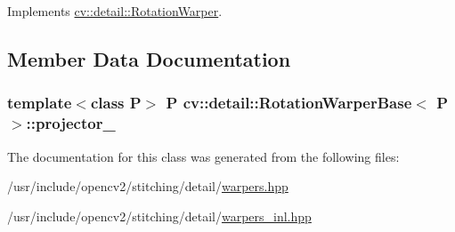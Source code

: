 Implements \hyperlink{classcv_1_1detail_1_1RotationWarper_a10e953cc9d9a5b88e736f3b68de91f0d}{cv\-::detail\-::\-Rotation\-Warper}.



\subsection{Member Data Documentation}
\hypertarget{classcv_1_1detail_1_1RotationWarperBase_a45db95bc22592f2aaef5e311ea23124c}{
\subsubsection[{projector\-\_\-}]{\setlength{\rightskip}{0pt plus 5cm}template$<$class P$>$ P {\bf cv\-::detail\-::\-Rotation\-Warper\-Base}$<$ P $>$\-::projector\-\_\-\hspace{0.3cm}{\ttfamily [protected]}}}\label{classcv_1_1detail_1_1RotationWarperBase_a45db95bc22592f2aaef5e311ea23124c}


The documentation for this class was generated from the following files\-:\begin{DoxyCompactItemize}
\item 
/usr/include/opencv2/stitching/detail/\hyperlink{detail_2warpers_8hpp}{warpers.\-hpp}\item 
/usr/include/opencv2/stitching/detail/\hyperlink{warpers__inl_8hpp}{warpers\-\_\-inl.\-hpp}\end{DoxyCompactItemize}
